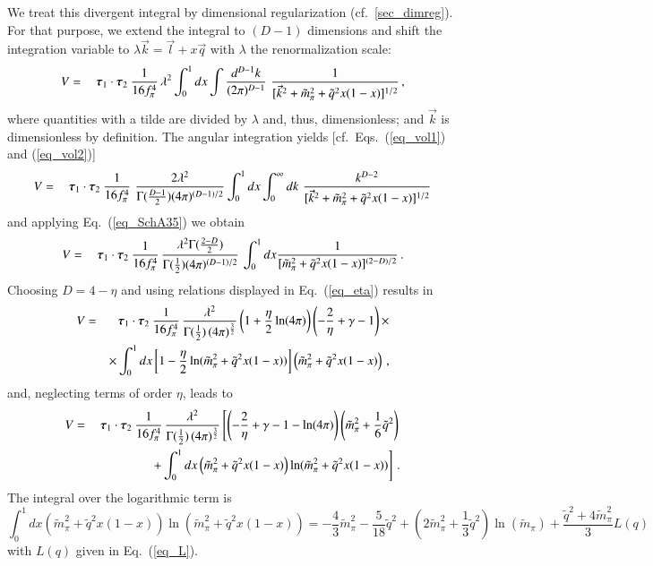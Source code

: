 \documentclass[sort&compress,preprint,3p]{elsarticle}
\newcommand{\bbox}[1]{\mbox{\boldmath $#1$}}
\begin{document}
We treat this divergent integral by dimensional regularization 
(cf.\ \ref{sec_dimreg}).
For that purpose, we extend the integral to $(D-1)$ dimensions and shift the
integration variable to 
$\lambda \vec k = \vec l + x \vec q$ 
with $\lambda$ the renormalization scale:
%
\begin{eqnarray}
V &=&
\: \bbox{\tau}_1 \cdot \bbox{\tau}_2 \:
\frac{1}{16 f_\pi^4} \,
\lambda^{2}
\int_0^1 dx \int \frac{d^{D-1}k}{(2 \pi)^{D-1}} \,\,
\frac{1}
{[\vec{k}^2 + \tilde{m}_\pi^2 + \tilde{q}^2 x (1-x)]^{1/2}}
\,,
\end{eqnarray}
where quantities with a tilde are divided by $\lambda$ and, thus, dimensionless;
and $\vec k$ is dimensionless by definition. 
%
The angular integration yields
[cf.\ Eqs.~(\ref{eq_vol1}) and (\ref{eq_vol2})]
%
\begin{eqnarray}
V &=&
\: \bbox{\tau}_1 \cdot \bbox{\tau}_2 \:
\frac{1}{16 f_\pi^4} \,\,
\frac{2\lambda^2}{\Gamma(\frac{D-1}{2}) (4 \pi)^{(D-1)/2}} 
\int_0^1 dx \int_0^\infty dk \,\,
\frac{k^{D-2}}
{[\vec{k}^2 + \tilde{m}_\pi^2 + \tilde{q}^2 x (1-x)]^{1/2}}
\end{eqnarray}
%
and applying Eq.~(\ref{eq_SchA35}) we obtain
%
\begin{eqnarray}
V &=&
\: \bbox{\tau}_1 \cdot \bbox{\tau}_2 \:
\frac{1}{16 f_\pi^4} \,
\frac{\lambda^{2}\Gamma(\frac{2-D}{2})}
{\Gamma(\frac 1 2) (4 \pi)^{(D-1)/2}} \,
\int_0^1 dx 
\frac{1}
{[\tilde{m}_\pi^2 + \tilde{q}^2 x (1-x)]^{(2-D)/2}}
\,.
\end{eqnarray}
%
Choosing $D=4-\eta$ and using relations displayed in
Eq.~(\ref{eq_eta}) results in
%
\begin{eqnarray}
V &=&
\: \bbox{\tau}_1 \cdot \bbox{\tau}_2 \:
\frac{1}{16 f_\pi^4} \,
\frac{\lambda^{2}}{\Gamma(\frac 1 2)\,(4 \pi)^{\frac{3}{2}}} 
\left(1+\frac{\eta}{2} \ln(4\pi)\right)
\left( -\frac 2 \eta + \gamma -1 \right) \times
\nonumber \\ && \times
\int_0^1 dx 
\left[1-\frac{\eta}{2} \ln(\tilde{m}_\pi^2 + \tilde{q}^2 x (1-x))\right]
\left(\tilde{m}_\pi^2 + \tilde{q}^2 x (1-x)\right)
\,,
\end{eqnarray}
%
and, neglecting terms of order $\eta$, leads to
%
\begin{eqnarray}
V &=&
\: \bbox{\tau}_1 \cdot \bbox{\tau}_2 \:
\frac{1}{16 f_\pi^4} \,
\frac{\lambda^{2}}{\Gamma(\frac 1 2)\,(4 \pi)^{\frac{3}{2}}} 
\left[
\left( -\frac 2 \eta +\gamma -1 -\ln (4\pi) \right)
\left(\tilde{m}_\pi^2 +\frac{1}{6} \tilde{q}^2 \right)
\right. \nonumber \\ && \left.
+\int_0^1 dx 
\left (\tilde{m}_\pi^2 + \tilde{q}^2 x (1-x) \right)
\ln(\tilde{m}_\pi^2 + \tilde{q}^2 x (1-x))
\right]
\,.
\end{eqnarray}
%
The integral over the logarithmic term is
%
\begin{equation}
\int_0^1 dx 
\left (\tilde{m}_\pi^2 + \tilde{q}^2 x (1-x) \right)
\ln(\tilde{m}_\pi^2 + \tilde{q}^2 x (1-x)) =
-\frac 4 3 \tilde{m}_\pi^2 - \frac{5}{18} \tilde q^2 +
\left(2\tilde m_\pi^2+ \frac 1 3 \tilde q^2 \right) \ln (\tilde m_\pi) +
\frac{\tilde q^2 + 4\tilde m_\pi^2}{3} L(q)
\end{equation}
with $L(q)$ given in Eq.~(\ref{eq_L}).
\end{document}
